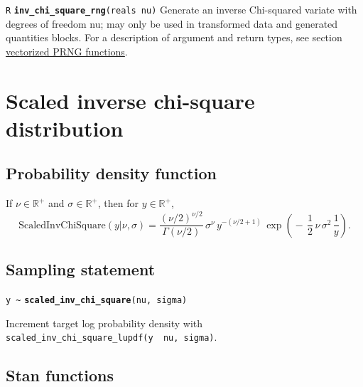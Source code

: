 \documentclass[
  10pt,
]{book}
\begin{document}

\texttt{R} \textbf{\texttt{inv\_chi\_square\_rng}}\texttt{(reals\ nu)}\newline
Generate an inverse Chi-squared variate with degrees of freedom nu;
may only be used in transformed data and generated quantities blocks.
For a description of argument and return types, see section
\protect\hyperlink{prng-vectorization}{vectorized PRNG functions}.

\hypertarget{scaled-inverse-chi-square-distribution}{%
\section{Scaled inverse chi-square distribution}\label{scaled-inverse-chi-square-distribution}}

\hypertarget{probability-density-function-11}{%
\subsection{Probability density function}\label{probability-density-function-11}}

If \(\nu \in \mathbb{R}^+\) and \(\sigma \in \mathbb{R}^+\), then for \(y \in \mathbb{R}^+\), \[ \text{ScaledInvChiSquare}(y|\nu,\sigma) =
\frac{(\nu / 2)^{\nu/2}}      {\Gamma(\nu / 2)} \, \sigma^{\nu} \,
y^{-(\nu/2 + 1)} \, \exp \! \left( \!    - \, \frac{1}{2} \, \nu \,
\sigma^2 \, \frac{1}{y} \right) . \]

\hypertarget{sampling-statement-35}{%
\subsection{Sampling statement}\label{sampling-statement-35}}

\texttt{y\ \textasciitilde{}} \textbf{\texttt{scaled\_inv\_chi\_square}}\texttt{(nu,\ sigma)}

Increment target log probability density with \texttt{scaled\_inv\_chi\_square\_lupdf(y\ \textbar{}\ nu,\ sigma)}.

\hypertarget{stan-functions-34}{%
\subsection{Stan functions}\label{stan-functions-34}}

\end{document}
